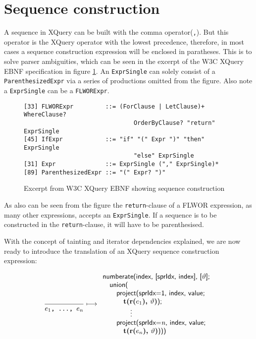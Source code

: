 \section{Sequence construction}
\label{sect:trans:TD:seqBuild}

A sequence in XQuery can be built with the comma operator(\texttt{,}). But this operator is the XQuery operator
with the lowest precedence, therefore, in most cases a sequence construction expression will be enclosed in
paratheses. This is to solve parser ambiguities, which can be seen in the excerpt of the W3C XQuery EBNF
specification\cite{w3c00} in figure \ref{fig:trans:TD:seqEBNF}. An \texttt{ExprSingle} can solely consist of a
\texttt{ParenthesizedExpr} via a series of productions omitted from the figure. Also note a \texttt{ExprSingle}
can be a \texttt{FLWORExpr}.

\begin{figure}[h]
\begin{Verbatim}
[33] FLWORExpr         ::= (ForClause | LetClause)+ WhereClause? 
                               OrderByClause? "return" ExprSingle
[45] IfExpr            ::= "if" "(" Expr ")" "then" ExprSingle 
                               "else" ExprSingle
[31] Expr              ::= ExprSingle ("," ExprSingle)*
[89] ParenthesizedExpr ::= "(" Expr? ")"
\end{Verbatim}
\caption[Excerpt from W3C XQuery EBNF]{Excerpt from W3C XQuery EBNF showing
sequence construction}
\label{fig:trans:TD:seqEBNF}
\end{figure}

As also can be seen from the figure the \texttt{return}-clause of a FLWOR expression, as many other expressions,
accepts an \texttt{ExprSingle}. If a sequence is to be constructed in the \texttt{return}-clause, it will have to
be parenthesised.

With the concept of tainting and iterator dependencies explained, we are now ready to introduce the translation of
an XQuery sequence construction expression:

\begin{equation}
\frac{}{e_{1}\mbox{\texttt{, \ldots, }}e_{n}}\longmapsto
\begin{array}{l}
\mbox{\textsf{numberate(index, [sprIdx, index], [}}\vartheta\mbox{\textsf{];}} \\ \quad
\mbox{\textsf{union(}} \\ \quad \quad
\mbox{\textsf{project(sprIdx=1, index, value; }} \\ \quad \quad \quad
\mbox{\textbf{t(r(}}e_{1}\mbox{\textbf{), }}\vartheta\mbox{\textbf{)}\textsf{);}} \\ \quad \quad
\qquad\vdots\\ \quad \quad
\mbox{\textsf{project(sprIdx=}\textit{n}\textsf{, index, value; }} \\ \quad \quad \quad
\mbox{\textbf{t(r(}}e_{n}\mbox{\textbf{), }}\vartheta\mbox{\textbf{)}\textsf{)))}}
\end{array}
\label{rule:trans:TD:seqConstr}
\end{equation}

